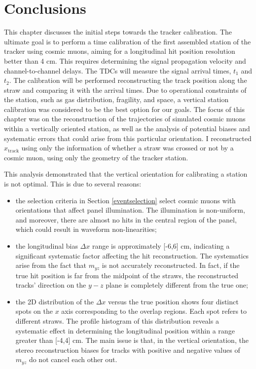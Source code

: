   \section{Conclusions}
  This chapter discusses the initial steps towards the tracker calibration.
  The ultimate goal is to perform a time calibration of 
  the first assembled station of the tracker using cosmic muons, aiming for a longitudinal hit 
  position resolution better than 4 cm. This requires determining the signal propagation velocity and 
  channel-to-channel delays. The TDCs will measure the signal arrival times, $t_1$ and $t_2$. 
  The calibration will be performed reconstructing the track position along the straw and comparing it with the arrival times. 
  Due to operational constraints of the station, such as gas distribution, fragility, and space, a 
  vertical station calibration was considered to be the best option for our goals.
  The focus of this chapter was on the reconstruction of the trajectories 
  of simulated cosmic muons within a vertically oriented station, as well as the 
  analysis of potential biases and systematic errors that could arise from this particular orientation. 
  I reconstructed $x_{\text{track}}$ using only the information of whether a straw was crossed 
  or not by a cosmic muon, using only the geometry of the tracker station.

This analysis demonstrated that the vertical orientation for calibrating a station is not optimal. This is due to several reasons:
\begin{itemize}
    \item the selection criteria in Section \ref{eventselection} select cosmic muons with orientations that affect panel illumination. 
    The illumination is non-uniform, and moreover, there are almost no hits in the central region of the panel, which could result in waveform non-linearities;
    \item the longitudinal bias $\Delta x$ range is approximately [-6,6] cm, indicating a significant systematic factor 
    affecting the hit reconstruction. The systematics arise from the fact that $m_{yz}$ is not accurately reconstructed.
    In fact, if the true hit position is far from the midpoint of the straws, the reconstructed tracks'
    direction on the $y-z$ plane is completely different from the true one;
    \item the 2D distribution of the $\Delta x$ versus the true position shows 
    four distinct spots on the $x$ axis corresponding to the overlap regions. Each spot refers to different straws. 
    The profile histogram of this distribution reveals a systematic effect in determining the 
    longitudinal position within a range greater than [-4,4] cm. The main issue is that, in the vertical orientation, the stereo 
    reconstruction biases for tracks with positive and negative values of $m_{yz}$ do not cancel each other out.
\end{itemize}

